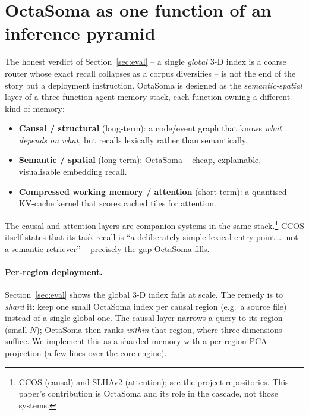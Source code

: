 \documentclass[11pt]{article}
\begin{document}
\section{OctaSoma as one function of an inference pyramid}
\label{sec:pyramid}
The honest verdict of Section~\ref{sec:eval} -- a single \emph{global} 3-D index is
a coarse router whose exact recall collapses as a corpus diversifies -- is not the
end of the story but a deployment instruction. OctaSoma is designed as the
\emph{semantic-spatial} layer of a three-function agent-memory stack, each function
owning a different kind of memory:
\begin{itemize}
  \item \textbf{Causal / structural} (long-term): a code/event graph that knows
  \emph{what depends on what}, but recalls lexically rather than semantically.
  \item \textbf{Semantic / spatial} (long-term): OctaSoma -- cheap, explainable,
  visualisable embedding recall.
  \item \textbf{Compressed working memory / attention} (short-term): a quantised
  KV-cache kernel that scores cached tiles for attention.
\end{itemize}
The causal and attention layers are companion systems in the same
stack.\footnote{CCOS (causal) and SLHAv2 (attention); see the project
repositories. This paper's contribution is OctaSoma and its role in the cascade,
not those systems.} CCOS itself states that its task recall is ``a deliberately
simple lexical entry point\,\dots\ not a semantic retriever'' -- precisely the gap
OctaSoma fills.

\paragraph{Per-region deployment.} Section~\ref{sec:eval} shows the global 3-D
index fails at scale. The remedy is to \emph{shard} it: keep one small OctaSoma
index per causal region (e.g.\ a source file) instead of a single global one. The
causal layer narrows a query to its region (small $N$); OctaSoma then ranks
\emph{within} that region, where three dimensions suffice. We implement this as a
sharded memory with a per-region PCA projection (a few lines over the core engine).
\end{document}
